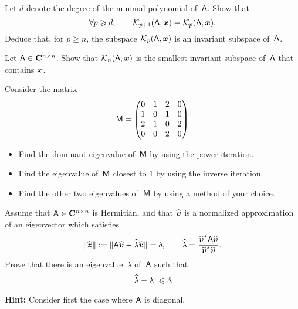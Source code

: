 \begin{exercise}
    Let $d$ denote the degree of the minimal polynomial of~$\mathsf A$.
    Show that
    \[
        \forall p \geqslant d, \qquad
        \mathcal K_{p+1}(\mathsf A, \mathbf{\boldsymbol{x}}) =
        \mathcal K_{p}(\mathsf A, \mathbf{\boldsymbol{x}}).
    \]
    Deduce that, for $p \geq n$,
    the subspace $\mathcal K_{p}(\mathsf A, \mathbf{\boldsymbol{x}})$ is an invariant subspace of~$\mathsf A$.
\end{exercise}

\begin{exercise}
    Let $\mathsf A \in \mathbf C^{n \times n}$.
    Show that $\mathcal K_{n}(\mathsf A, \mathbf{\boldsymbol{x}})$ is the smallest invariant subspace of~$\mathsf A$ that contains $\mathbf{\boldsymbol{x}}$.
\end{exercise}

\begin{compexercise}
    Consider the matrix
    \[
        \mathsf M =
        \begin{pmatrix}
            0 & 1 & 2 & 0 \\
            1 & 0 & 1 & 0 \\
            2 & 1 & 0 & 2 \\
            0 & 0 & 2 & 0
        \end{pmatrix}
    \]
    \begin{itemize}
        \item Find the dominant eigenvalue of~$\mathsf M$ by using the power iteration.
        \item Find the eigenvalue of~$\mathsf M$ closest to 1 by using the inverse iteration.
        \item Find the other two eigenvalues of~$\mathsf M$ by using a method of your choice.
    \end{itemize}
\end{compexercise}

\begin{exercise}
    \label{exercise:a_posteriori_1}
    Assume that $\mathsf A \in \mathbf C^{n \times n}$ is Hermitian,
    and that $\widehat {\mathbf{\boldsymbol{v}}}$ is a normalized approximation of an eigenvector which satisfies
    \[
        \lVert\widehat {\mathbf{\boldsymbol{z}}}\rVert :=  \lVert\mathsf A \widehat {\mathbf{\boldsymbol{v}}} - \widehat \lambda \widehat {\mathbf{\boldsymbol{v}}}\rVert = \delta,
        \qquad \widehat \lambda = \frac{\widehat {\mathbf{\boldsymbol{v}}}^* \mathsf A \widehat {\mathbf{\boldsymbol{v}}}}{\widehat {\mathbf{\boldsymbol{v}}}^* \widehat {\mathbf{\boldsymbol{v}}}}.
    \]
    Prove that there is an eigenvalue~$\lambda$ of~$\mathsf A$ such that
    \[
        \lvert\widehat \lambda - \lambda\rvert \leqslant \delta.
    \]

    \noindent \textbf{Hint:} Consider first the case where $\mathsf A$ is diagonal.
\end{exercise}

